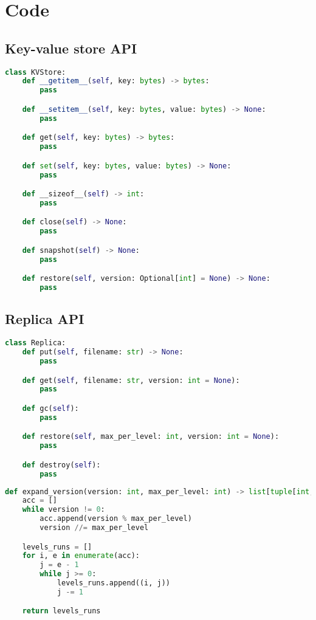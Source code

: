 

\chapter{Code} %

\label{Appendix-A-code} %

\section{Key-value store API}

\begin{lstlisting}[language=Python, caption=Key-value store API - method signatures.]
class KVStore:
    def __getitem__(self, key: bytes) -> bytes:
        pass

    def __setitem__(self, key: bytes, value: bytes) -> None:
        pass

    def get(self, key: bytes) -> bytes:
        pass

    def set(self, key: bytes, value: bytes) -> None:
        pass

    def __sizeof__(self) -> int:
        pass

    def close(self) -> None:
        pass

    def snapshot(self) -> None:
        pass

    def restore(self, version: Optional[int] = None) -> None:
        pass
\end{lstlisting}

\section{Replica API}

\begin{lstlisting}[language=Python, caption=Replica API - method signatures.]
class Replica:
    def put(self, filename: str) -> None:
        pass

    def get(self, filename: str, version: int = None):
        pass

    def gc(self):
        pass

    def restore(self, max_per_level: int, version: int = None):
        pass

    def destroy(self):
        pass
\end{lstlisting}

\begin{lstlisting}[language=Python, caption=Algorithm used in snapshot rollback.]
def expand_version(version: int, max_per_level: int) -> list[tuple[int, int]]:
    acc = []
    while version != 0:
        acc.append(version % max_per_level)
        version //= max_per_level

    levels_runs = []
    for i, e in enumerate(acc):
        j = e - 1
        while j >= 0:
            levels_runs.append((i, j))
            j -= 1

    return levels_runs
\end{lstlisting}
